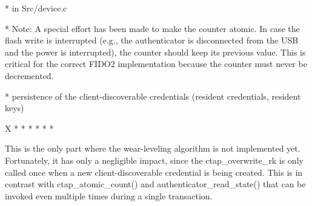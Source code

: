 *  in Src/device.c

* Note: A special effort has been made to make the counter atomic. In case the flash write is interrupted (e.g., the authenticator is disconnected from the USB and the power is interrupted), the counter should keep its previous value. This is critical for the correct FIDO2 implementation because the counter must never be decremented.

\enditems

* persistence of the client-discoverable credentials (resident credentials, resident keys)

\begitems \style X
* 
* 
* 
* 
* 
* 

This is the only part where the wear-leveling algorithm is not implemented yet.
Fortunately, it has only a negligible impact, since the ctap_overwrite_rk is only called once when a new client-discoverable credential is being created. This is in contrast with ctap_atomic_count() and authenticator_read_state() that can be invoked even multiple times during a single transaction.

\enditems

\enditems





